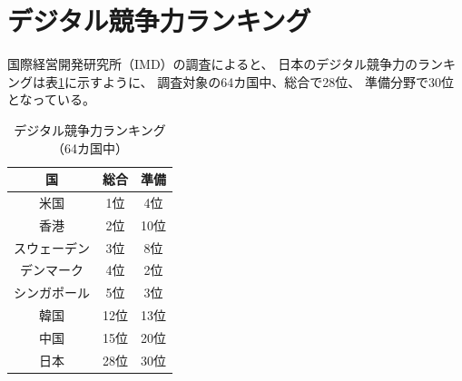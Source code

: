 \documentclass[a4paper,11pt,dvipdfmx]{ujarticle}
\begin{document}
\section{デジタル競争力ランキング}

国際経営開発研究所（IMD）の調査\cite{imd}によると、
日本のデジタル競争力のランキングは表\ref{degirank}に示すように、
調査対象の64カ国中、総合で28位、
準備分野で30位となっている。

\begin{table}[htbp]
    \centering
    \caption{デジタル競争力ランキング（64カ国中）}
    \label{degirank}
    \begin{tabular}{|c|c|c|}
        \hline
         国 & 総合 & 準備 \\
         \hline
         米国 & 1位 & 4位 \\
         \hline
         香港 & 2位 & 10位 \\
         \hline
         スウェーデン & 3位 & 8位 \\
         \hline
         デンマーク & 4位 & 2位 \\
         \hline
         シンガポール & 5位 & 3位 \\
        \hline
        \hline
         韓国 & 12位 & 13位 \\
         \hline
         中国 & 15位 & 20位 \\
         \hline
         \hline
         日本 & 28位 & 30位 \\
         \hline
     \end{tabular}
\end{table}

\end{document}
